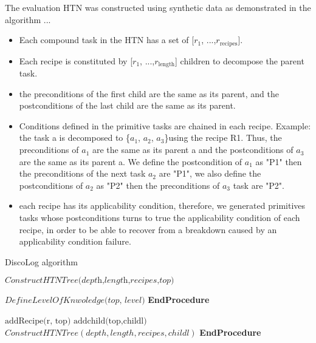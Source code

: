The evaluation HTN was constructed using synthetic data as demonstrated in the algorithm ...
\begin{itemize}
	\item Each compound task in the HTN has a set of [$r_1$, ...,$r_\text{recipes}$].
	\item Each recipe is constituted by [$r_1$, ...,$r_\text{length}$] children to decompose the parent task.
	\item the preconditions of the first child are the same as its parent, and the postconditions of the last child are the same as its parent. 
	\item Conditions defined in the primitive tasks are chained in each recipe. Example: the task a is decomposed to \{$a_1$, $a_2$, $a_3$\}using the recipe R1. Thus, the preconditions of $a_1$ are the same as its parent a and the postconditions of $a_3$ are the same as its parent a. We define the postcondition of $a_1$ as "P1" then the preconditions of the next task $a_2$ are "P1", we also define the postconditions of $a_2$ as "P2" then the preconditions of $a_3$ task are "P2".
	\item each recipe has its applicability condition, therefore, we generated primitives tasks whose postconditions turns to true the applicability condition of each recipe, in order to be able to recover from a breakdown caused by an applicability condition failure. 
\end{itemize}
\begin{algorithm}
\caption{DiscoLog algorithm }\label{tree}
\begin{algorithmic}[]
	\State $\textit{ConstructHTNTree(depth,length,recipes,top)} $

	\State $\textit{DefineLevelOfKnwoledge(top, level)} $
	\EndProcedure \textbf{EndProcedure}
	\State
	\State
	
\State $\text{addRecipe(r, top)}$
\State $\text{addchild(top,childl})$
\State $ConstructHTNTree(depth,length,recipes,childl)$
\EndFor
\EndFor
\EndIf
	\EndProcedure \textbf{EndProcedure}
\end{algorithmic}
\end{algorithm}
